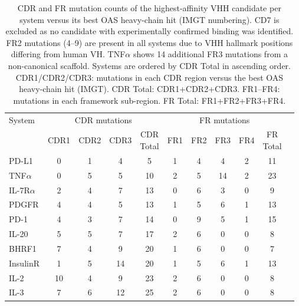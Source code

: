 \documentclass[11pt]{article}
\begin{document}
\begin{table}[!htbp]
\centering
\begin{tabular}{l*{5}{c}*{5}{c}}
\toprule
System & \multicolumn{4}{c}{CDR mutations} & \multicolumn{5}{c}{FR mutations}\\
\cmidrule(lr){2-5}\cmidrule(lr){6-10}
 & CDR1 & CDR2 & CDR3 & \shortstack[c]{CDR\\Total} & FR1 & FR2 & FR3 & FR4 & \shortstack[c]{FR\\Total}\\
\midrule
PD-L1     & 0  & 1  & 4  & 5  & 1 & 4 & 4  & 2 & 11\\
TNF$\alpha$   & 0  & 5  & 5  & 10 & 2 & 5 & 14 & 2 & 23\\
IL-7R$\alpha$ & 2  & 4  & 7  & 13 & 0 & 6 & 3  & 0 & 9\\
PDGFR     & 4  & 4  & 5  & 13 & 1 & 5 & 6  & 1 & 13\\
PD-1      & 4  & 3  & 7  & 14 & 0 & 9 & 5  & 1 & 15\\
IL-20     & 5  & 5  & 7  & 17 & 2 & 6 & 0  & 0 & 8\\
BHRF1     & 7  & 4  & 9  & 20 & 1 & 6 & 0  & 0 & 7\\
InsulinR  & 1  & 5  & 14 & 20 & 1 & 5 & 6  & 1 & 13\\
IL-2      & 10 & 4  & 9  & 23 & 2 & 6 & 0  & 0 & 8\\
IL-3      & 7  & 6  & 12 & 25 & 2 & 6 & 0  & 0 & 8\\
\bottomrule
\end{tabular}
\caption{CDR and FR mutation counts of the highest-affinity VHH candidate per system versus its
best OAS heavy-chain hit (IMGT numbering). CD7 is excluded as no candidate with experimentally
confirmed binding was identified. FR2 mutations (4--9) are present in all systems due to VHH
hallmark positions differing from human VH. TNF$\alpha$ shows 14 additional FR3 mutations from a
non-canonical scaffold. Systems are ordered by CDR Total in ascending order.
CDR1/CDR2/CDR3: mutations in each CDR region versus the best OAS heavy-chain hit (IMGT). CDR Total:
CDR1+CDR2+CDR3. FR1--FR4: mutations in each framework sub-region. FR Total: FR1+FR2+FR3+FR4.}
\label{tab:oas_besthit}
\end{table}
\end{document}
